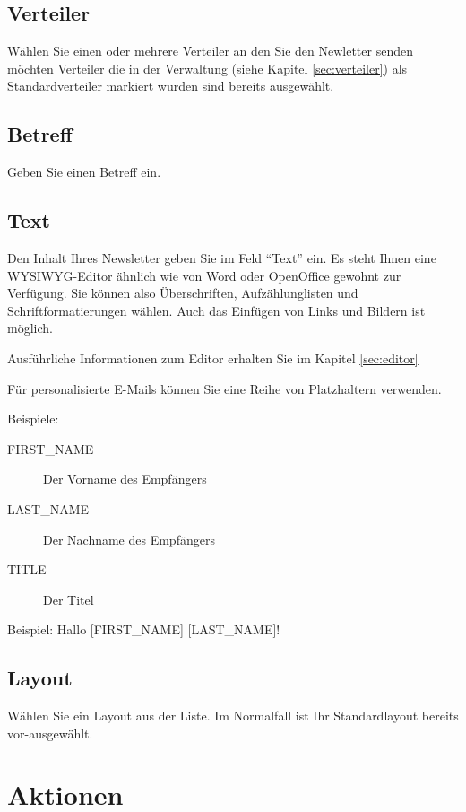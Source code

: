\documentclass[article, a4paper, oneside, 11pt]{memoir}
\begin{document}
\subsection{Verteiler}

Wählen Sie einen oder mehrere Verteiler an den Sie den Newletter senden möchten
Verteiler die in der Verwaltung (siehe Kapitel \vref{sec:verteiler}) als Standardverteiler markiert wurden sind bereits ausgewählt.

\subsection{Betreff}

Geben Sie einen Betreff ein.

\subsection{Text}

Den Inhalt Ihres Newsletter geben Sie im Feld "`Text"' ein. Es steht Ihnen eine WYSIWYG-Editor ähnlich wie von Word oder OpenOffice gewohnt zur Verfügung. Sie können also Überschriften, Aufzählunglisten und Schriftformatierungen wählen. Auch das Einfügen von Links und Bildern ist möglich.

Ausführliche Informationen zum Editor erhalten Sie im Kapitel \vref{sec:editor}

Für personalisierte E-Mails können Sie eine Reihe von Platzhaltern verwenden.

Beispiele:
\begin{description}
 \item[\lbrack FIRST\_NAME\rbrack] Der Vorname des Empfängers
 \item[\lbrack LAST\_NAME\rbrack] Der Nachname des Empfängers
 \item[\lbrack TITLE\rbrack] Der Titel
\end{description}

Beispiel: Hallo [FIRST\_NAME] [LAST\_NAME]!

\subsection{Layout}

Wählen Sie ein Layout aus der Liste. Im Normalfall ist Ihr Standardlayout bereits vor-ausgewählt.

\section{Aktionen}
\end{document}
